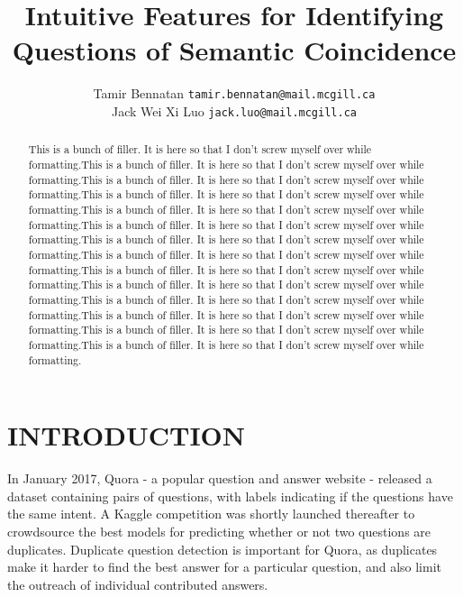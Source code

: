 \documentclass[letterpaper, 10 pt, conference]{ieeeconf}  %
\title{\LARGE \bf
Intuitive Features for Identifying Questions of Semantic Coincidence
}
\author{ \parbox{3 in}{\centering Tamir Bennatan
         {\tt\small tamir.bennatan@mail.mcgill.ca}}
         \hspace*{ 0.5 in}
         \parbox{3 in}{ \centering Jack Wei Xi Luo
         \break
         {\tt\small jack.luo@mail.mcgill.ca}}
}
\begin{document}
\maketitle
\thispagestyle{empty}
\pagestyle{empty}


\begin{abstract}

This is a bunch of filler. It is here so that I don't screw myself over while formatting.This is a bunch of filler. It is here so that I don't screw myself over while formatting.This is a bunch of filler. It is here so that I don't screw myself over while formatting.This is a bunch of filler. It is here so that I don't screw myself over while formatting.This is a bunch of filler. It is here so that I don't screw myself over while formatting.This is a bunch of filler. It is here so that I don't screw myself over while formatting.This is a bunch of filler. It is here so that I don't screw myself over while formatting.This is a bunch of filler. It is here so that I don't screw myself over while formatting.This is a bunch of filler. It is here so that I don't screw myself over while formatting.This is a bunch of filler. It is here so that I don't screw myself over while formatting.This is a bunch of filler. It is here so that I don't screw myself over while formatting.This is a bunch of filler. It is here so that I don't screw myself over while formatting.This is a bunch of filler. It is here so that I don't screw myself over while formatting.This is a bunch of filler. It is here so that I don't screw myself over while formatting.

\end{abstract}


\section{INTRODUCTION}

In January 2017, Quora - a popular question and answer website - released a dataset containing pairs of questions, with labels indicating if the questions have the same intent. A Kaggle competition was shortly launched thereafter to crowdsource the best models for predicting whether or not two questions are duplicates. Duplicate question detection is important for Quora, as duplicates make it harder to find the best answer for a particular question, and also limit the outreach of individual contributed answers.
\end{document}
